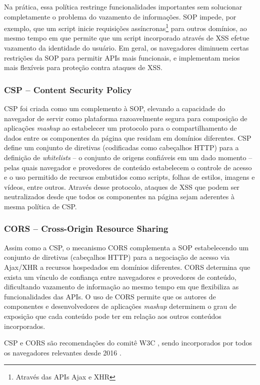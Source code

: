 Na prática, essa política restringe funcionalidades importantes sem solucionar completamente o problema do vazamento de informações. SOP impede, por exemplo, que um script inicie requisições assíncronas\footnote{Através das	APIs Ajax e XHR} para outros domínios, ao mesmo tempo em que permite que um script incorporado através de XSS efetue vazamento da identidade do usuário. Em geral, os navegadores diminuem certas restrições da SOP para permitir APIs mais funcionais, e implementam meios mais flexíveis para proteção contra ataques de XSS.

\subsubsection{CSP -- Content Security Policy}
CSP foi criada como um complemento à SOP, elevando a capacidade do navegador de servir como plataforma razoavelmente segura para composição de aplicações \textit{mashup} ao estabelecer um protocolo para o compartilhamento de dados entre os componentes da página que residam em domínios diferentes. CSP define um conjunto de diretivas (codificadas como cabeçalhos HTTP) para a definição de \textit{whitelists} -- o conjunto de origens confiáveis em um dado momento -- pelas quais navegador e provedores de conteúdo estabelecem o controle de acesso e o uso permitido de recursos embutidos como scripts, folhas de estilos, imagens e vídeos, entre outros. Através desse protocolo, ataques de XSS que podem ser neutralizados desde que todos os componentes na página sejam aderentes à mesma política de CSP.

\subsubsection{CORS -- Cross-Origin Resource Sharing}
Assim como a CSP, o mecanismo CORS \cite{W3C:CORS} complementa a SOP estabelecendo um conjunto de diretivas (cabeçalhos HTTP) para a negociação de acesso via Ajax/XHR a recursos hospedados em domínios diferentes. CORS determina que exista um vínculo de confiança entre navegadores e provedores de conteúdo, dificultando vazamento de informação ao mesmo tempo em que flexibiliza as funcionalidades das APIs. O uso de CORS permite que os autores de componentes e desenvolvedores de aplicações \textit{mashup} determinem o grau de exposição que cada conteúdo pode ter em relação aos outros conteúdos incorporados.

CSP e CORS são recomendações do comitê W3C \cite{W3C:CSP} \cite{W3C:CORS}, sendo incorporados por todos os navegadores relevantes desde 2016 \cite{CanIUse:CSP} \cite{CanIUse:CORS}.


